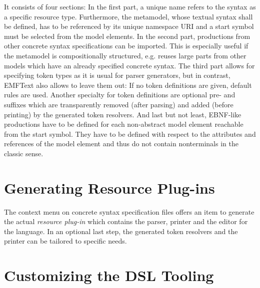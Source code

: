It consists of four sections: In the first part, a unique
name refers to the syntax as a specific resource type. Furthermore, the metamodel, 
whose textual syntax shall be defined, has 
to be referenced by its  unique namespace URI and a start symbol must be selected from 
the model elements. In the second part, productions from other concrete syntax 
specifications can be imported. This is especially useful if the metamodel is 
compositionally structured, e.g. reuses large parts from other models which have an 
already specified concrete syntax.  The third part allows for specifying token types as
 it is usual for parser generators, but in contrast, EMFText also allows to leave them 
 out: If no token definitions are given, default rules are used. Another specialty for 
 token definitions are optional pre- and suffixes which are transparently removed (after 
 parsing) and added (before printing) by the generated token resolvers. And last but 
 not least, EBNF-like productions have to be defined for each non-abstract model element 
 reachable from the start symbol. They have to be defined with respect to the attributes 
 and references of the model element and thus do not contain nonterminals in the classic 
 sense.

\section{Generating Resource Plug-ins}

The context menu on concrete syntax specification files offers an item to generate the 
actual \emph{resource plug-in} which contains the parser, printer and the editor
for the language. In an optional last step, the generated token resolvers and the printer 
can be tailored to specific needs.

\section{Customizing the DSL Tooling}

